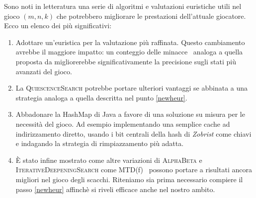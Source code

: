 \documentclass{article}
\begin{document}
Sono noti in letteratura una serie di algoritmi e valutazioni euristiche utili
nel gioco $(m, n, k)$ che potrebbero migliorare le prestazioni dell'attuale
giocatore. Ecco un elenco dei pi\`u significativi:
\begin{enumerate}
  \item Adottare un'euristica per la valutazione pi\`u raffinata. Questo cambiamento
    avrebbe il maggiore impatto: un conteggio delle minacce~\cite{heur}
    analoga a quella proposta da \citeauthor{heur} migliorerebbe significativamente
    la precisione sugli stati pi\`u avanzati del gioco. \label{newheur}
  \item La \textsc{QuiescenceSearch} potrebbe portare ulteriori vantaggi se
    abbinata a una strategia analoga a quella descritta nel punto \vref{newheur}.
  \item Abbadonare la HashMap di Java a favore di una soluzione su misura
    per le necessit\`a del gioco. Ad esempio implementando una semplice cache
    ad indirizzamento diretto, usando i bit centrali della hash di \emph{Zobrist}
    come chiavi e indagando la strategia di rimpiazzamento pi\`u adatta.
  \item \`E stato infine mostrato come altre variazioni di \textsc{AlphaBeta} e
    \textsc{IterativeDeepeningSearch} come MTD(f)~\cite{mtdf} possono portare a
    risultati ancora migliori nel gioco degli scacchi. Riteniamo sia prima
    necessario compiere il passo \vref{newheur} affinch\`e si riveli efficace anche nel nostro ambito.
\end{enumerate}



\end{document}
